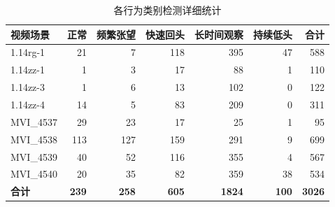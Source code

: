 
\begin{table}[htbp]
\centering
\caption{各行为类别检测详细统计}
\label{tab:behavior_detail}
\begin{tabular}{lrrrrrr}
\toprule
视频场景 & 正常 & 频繁张望 & 快速回头 & 长时间观察 & 持续低头 & 合计 \\
\midrule
1.14rg-1 & 21 & 7 & 118 & 395 & 47 & 588 \\
1.14zz-1 & 1 & 3 & 17 & 88 & 1 & 110 \\
1.14zz-3 & 1 & 6 & 13 & 102 & 0 & 122 \\
1.14zz-4 & 14 & 5 & 83 & 209 & 0 & 311 \\
MVI_4537 & 29 & 23 & 17 & 25 & 1 & 95 \\
MVI_4538 & 113 & 127 & 159 & 291 & 9 & 699 \\
MVI_4539 & 40 & 52 & 116 & 355 & 4 & 567 \\
MVI_4540 & 20 & 35 & 82 & 359 & 38 & 534 \\
\midrule
\textbf{合计} & \textbf{239} & \textbf{258} & \textbf{605} & \textbf{1824} & \textbf{100} & \textbf{3026} \\
\bottomrule
\end{tabular}
\end{table}

